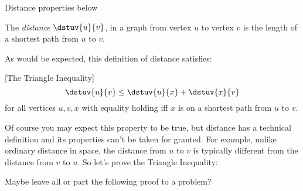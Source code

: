 \iffalse

Actually, we proved something stronger:
\begin{corollary}\label{pathlewalk_cor}
For any walk in a digraph, there is a path starting and ending at the
same vertices as the walk and containing only edges in the walk.  Such
a path is necessarily no longer than the walk.
\end{corollary}
\fi

\begin{editingnotes}
Distance properties below 
\end{editingnotes}

\begin{definition}
  The  \emph{distance}
  $\dstuv{u}{v}$, in a graph from vertex $u$ to vertex $v$ is the
  length of a shortest path from $u$ to $v$.
\end{definition}

As would be expected, this definition of distance satisfies:
\begin{lemma}\label{lem:tri-ineq} [The Triangle Inequality]
\[
\dstuv{u}{v} \leq \dstuv{u}{x} + \dstuv{x}{v}
\]
for all vertices $u,v,x$ with equality holding iff $x$ is on a shortest
path from $u$ to $v$.
\end{lemma}
Of course you may expect this property to be true, but distance has a
technical definition and its properties can't be taken for granted.
For example, unlike ordinary distance in space, the distance from $u$
to $v$ is typically different from the distance from $v$ to $u$.
So let's prove the Triangle Inequality:

\begin{editingnotes}
  Maybe leave all or part the following proof to a problem?
\end{editingnotes}

